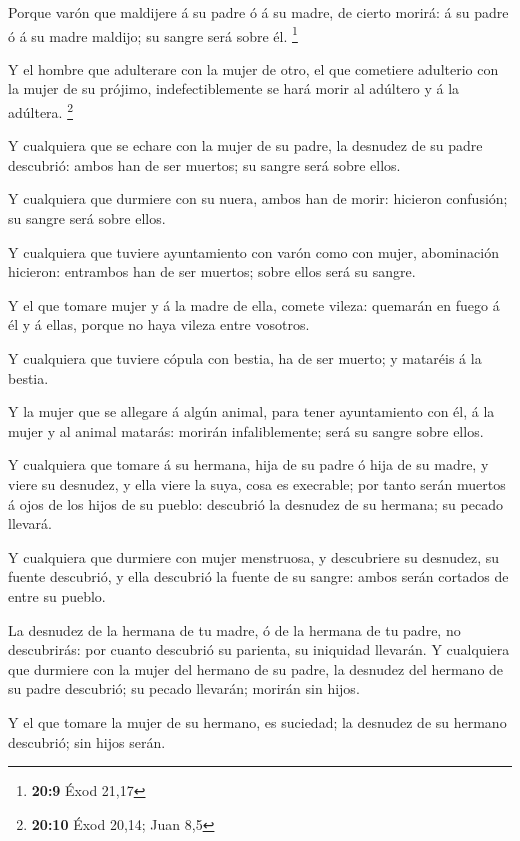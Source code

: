  Porque varón que maldijere á su padre ó á su madre, de
cierto morirá: á su padre ó á su madre maldijo; su sangre será sobre él.
\footnote{\textbf{20:9} Éxod 21,17}

 Y el hombre que adulterare con la mujer de otro, el que
cometiere adulterio con la mujer de su prójimo, indefectiblemente se
hará morir al adúltero y á la adúltera. \footnote{\textbf{20:10} Éxod
  20,14; Juan 8,5}

 Y cualquiera que se echare con la mujer de su padre, la
desnudez de su padre descubrió: ambos han de ser muertos; su sangre será
sobre ellos.

 Y cualquiera que durmiere con su nuera, ambos han de
morir: hicieron confusión; su sangre será sobre ellos.

 Y cualquiera que tuviere ayuntamiento con varón como con
mujer, abominación hicieron: entrambos han de ser muertos; sobre ellos
será su sangre.

 Y el que tomare mujer y á la madre de ella, comete
vileza: quemarán en fuego á él y á ellas, porque no haya vileza entre
vosotros.

 Y cualquiera que tuviere cópula con bestia, ha de ser
muerto; y mataréis á la bestia.

 Y la mujer que se allegare á algún animal, para tener
ayuntamiento con él, á la mujer y al animal matarás: morirán
infaliblemente; será su sangre sobre ellos.

 Y cualquiera que tomare á su hermana, hija de su padre ó
hija de su madre, y viere su desnudez, y ella viere la suya, cosa es
execrable; por tanto serán muertos á ojos de los hijos de su pueblo:
descubrió la desnudez de su hermana; su pecado llevará.

 Y cualquiera que durmiere con mujer menstruosa, y
descubriere su desnudez, su fuente descubrió, y ella descubrió la fuente
de su sangre: ambos serán cortados de entre su pueblo.

 La desnudez de la hermana de tu madre, ó de la hermana
de tu padre, no descubrirás: por cuanto descubrió su parienta, su
iniquidad llevarán.  Y cualquiera que durmiere con la
mujer del hermano de su padre, la desnudez del hermano de su padre
descubrió; su pecado llevarán; morirán sin hijos.

 Y el que tomare la mujer de su hermano, es suciedad; la
desnudez de su hermano descubrió; sin hijos serán.


